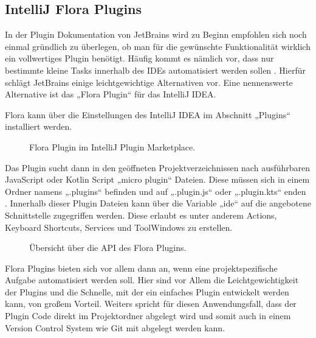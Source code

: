 \subsection{IntelliJ Flora Plugins}

In der Plugin Dokumentation von JetBrains wird zu Beginn 
empfohlen sich noch einmal gründlich zu überlegen, ob man 
für die gewünschte Funktionalität wirklich ein 
vollwertiges Plugin benötigt. Häufig kommt es nämlich vor, 
dass nur bestimmte kleine Tasks innerhalb des IDEs 
automatisiert werden sollen \cite{IntelliJSDKDocumentation}. Hierfür schlägt JetBrains 
einige leichtgewichtige Alternativen vor. Eine nennenswerte 
Alternative ist das „Flora Plugin“ für das IntelliJ IDEA. 

Flora kann über die Einstellungen des IntelliJ IDEA 
im Abschnitt „Plugins“ installiert werden.

\begin{figure}
    \centering
    \caption{Flora Plugin im IntelliJ Plugin Marketplace.}
    \label{fig:FloraPlugin}
\end{figure}    
 
Das Plugin sucht dann in den geöffneten Projektverzeichnissen
nach ausführbaren JavaScript oder Kotlin Script „micro plugin“ 
Dateien. Diese müssen sich in einem Ordner namens „.plugins“ 
befinden und auf „.plugin.js“ oder „.plugin.kts“ enden \cite{FloraPluginMarketplace}.
Innerhalb dieser Plugin Dateien kann über die Variable „ide“ auf 
die angebotene Schnittstelle zugegriffen werden. Diese erlaubt 
es unter anderem Actions, Keyboard Shortcuts, Services und 
ToolWindows zu erstellen.

\begin{figure}
    \centering
    \caption{Übersicht über die API des Flora Plugins.}
    \label{fig:FloraPluginAPI}
\end{figure}    
 
Flora Plugins bieten sich vor allem dann an, wenn eine projektspezifische 
Aufgabe automatisiert werden soll. Hier sind vor Allem die 
Leichtgewichtigkeit der Plugins und die Schnelle, mit der ein 
einfaches Plugin entwickelt werden kann, von großem Vorteil. 
Weiters spricht für diesen Anwendungsfall, dass der Plugin Code 
direkt im Projektordner abgelegt wird und somit auch in einem Version 
Control System wie Git mit abgelegt werden kann.

